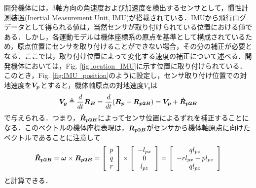 開発機体には，3軸方向の角速度および加速度を検出するセンサとして，慣性計測装置(Inertial Measurement Unit, IMU)が搭載されている．IMUから飛行ログデータとして得られる値は，当然センサが取り付けられている位置における値である．しかし，各運動モデルは機体座標系の原点を基準として構成されているため，原点位置にセンサを取り付けることができない場合，その分の補正が必要となる．ここでは，取り付け位置によって変化する速度の補正について述べる．開発機体においては，Fig. \ref{fig:location_IMU}に示す位置に取り付けられている．このとき，Fig. \ref{fig:IMU_position}のように設定し，センサ取り付け位置での対地速度を$\mbox{\boldmath $V_p$}$とすると，機体軸原点の対地速度\mbox{\boldmath $V_g$}は
\begin{equation}
  \mbox{\boldmath $V_g$} \triangleq \dfrac{d}{dt}\mbox{\boldmath $R_{B}$} = \dfrac{d}{dt}(\mbox{\boldmath $R_{p}$} + \mbox{\boldmath $R_{p2B}$}) =  \mbox{\boldmath $V_p$}+\mbox{\boldmath $\dot{R}_{p2B}$}
\end{equation}
で与えられる．つまり，$\mbox{\boldmath $\dot{R}_{p2B}$}$によってセンサ位置によるずれを補正することになる．このベクトルの機体座標表現は，$\mbox{\boldmath $R_{p2B}$}$がセンサから機体軸原点に向けたベクトルであることに注意して
\begin{equation}
  \mbox{\boldmath $\dot{R}_{p2B}$} = \mbox{\boldmath $\omega$}\times\mbox{\boldmath $R_{p2B}$} =
  \left[
    \begin{array}{ccc}
      p \\
      q \\
      r
    \end{array}
  \right] \times
  \left[
    \begin{array}{ccc}
      -l_{px} \\
      0 \\
      l_{pz}
    \end{array}
  \right] =
  \left[
    \begin{array}{ccc}
      ql_{pz} \\
      -rl_{px} - pl_{pz} \\
      ql_{px}
    \end{array}
  \right]
\end{equation}
と計算できる．


